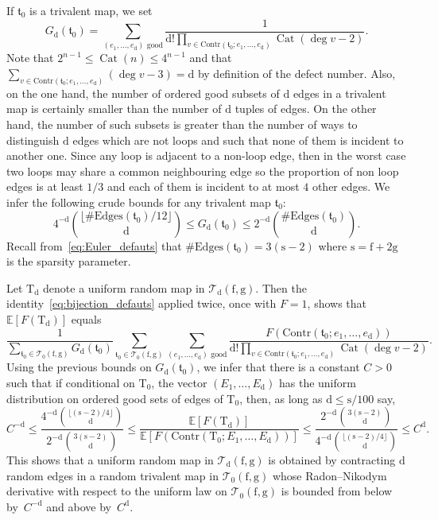 \documentclass[10pt]{amsart}
\DeclareMathOperator{\Cat}{Cat}
\theoremstyle{plain}
\theoremstyle{definition}
\theoremstyle{remark}
\newcommand{\E}{\mathbb{E}}
\newcommand{\Triv}{\mathrm{T}}
\newcommand{\face}{\mathrm{f}}
\newcommand{\defect}{\mathrm{d}}
\newcommand{\gen}{\mathrm{g}}
\newcommand{\spar}{\mathrm{s}}
\begin{document}
If $\mathfrak{t}_0$ is a trivalent map, we set
\[
G_\defect(\mathfrak{t}_0) = \sum_{(e_1, \dots, e_{\defect}) \text{ good}} \frac{1}{\defect! \prod_{v \in \mathrm{Contr}(\mathfrak{t}_0 ; e_1, \dots, e_{\defect})} \Cat(\deg v - 2)}.
\]
Note that $2^{n-1} \le \Cat(n) \le 4^{n-1}$ and that $\sum_{v \in \mathrm{Contr}(\mathfrak{t}_0 ; e_1, \dots, e_{\defect})} (\deg v - 3) = \defect$ by definition of the defect number. Also, on the one hand, the number of ordered good subsets of $\defect$ edges in a trivalent map is certainly smaller than the number of $\defect$ tuples of edges.
On the other hand, the number of such subsets is greater than the number of ways to distinguish $\defect$ edges which are not loops and such that none of them is incident to another one. Since any loop is adjacent to a non-loop edge, then in the worst case two loops may share a common neighbouring edge so the proportion of non loop edges is at least $1/3$ and each of them is incident to at most $4$ other edges.
We infer the following crude bounds for any trivalent map $\mathfrak{t}_0$:
\[
4^{-\defect} \binom{\lfloor \#\mathrm{Edges}(\mathfrak{t}_0)/12\rfloor}{\defect} \le G_\defect(\mathfrak{t}_0) \le 2^{-\defect} \binom{\#\mathrm{Edges}(\mathfrak{t}_0)}{\defect}.
\]
Recall from~\eqref{eq:Euler_defauts} that $\#\mathrm{Edges}(\mathfrak{t}_0) = 3(\spar-2)$ where $\spar = \face+2\gen$ is the sparsity parameter.

Let $\Triv_\defect$ denote a uniform random map in $\mathcal{T}_{\defect}(\face,\gen)$. Then the identity~\eqref{eq:bijection_defauts} applied twice, once with $F=1$, shows that $\E[F(\Triv_{ \defect})]$ equals
\[
\frac{1}{\sum_{\mathfrak{t}_0 \in \mathcal{T}_0(\face, \gen)} G_\defect(\mathfrak{t}_0)} \sum_{\mathfrak{t}_0 \in \mathcal{T}_0(\face, \gen)} \sum_{(e_1, \dots, e_\defect) \text{ good}} \frac{F(\mathrm{Contr}(\mathfrak{t}_0 ; e_1, \dots, e_\defect))}{\defect! \prod_{v \in \mathrm{Contr}(\mathfrak{t}_0 ; e_1, \dots, e_\defect)} \Cat(\deg v - 2)}.
\]
Using the previous bounds on $G_\defect(\mathfrak{t}_0)$, we infer that there is a constant $C>0$ such that if conditional on $\Triv_0$, the vector $(E_1, \dots, E_\defect)$ has the uniform distribution on ordered good sets of edges of $\Triv_0$, then, as long as $ \defect \le \spar/100$ say,
\begin{equation} \label{eq:RNexp}
C^{-\defect}
\le \frac{4^{-\defect} \binom{\lfloor (\spar-2)/4\rfloor}{\defect}}{2^{-\defect} \binom{3 (\spar-2)}{\defect}}
\le \frac{\E[F(\Triv_{ \defect})]}{\E[F(\mathrm{Contr}(\Triv_0 ; E_1, \dots, E_\defect))]}
\le \frac{2^{-\defect} \binom{3 (\spar-2)}{\defect}}{4^{-\defect} \binom{\lfloor (\spar-2)/4\rfloor}{\defect}}
\le C^\defect.
\end{equation}
This shows that a uniform random map in $\mathcal{T}_{\defect}(\face,\gen)$ is obtained by contracting $ \defect$ random edges in a random trivalent map in $\mathcal{T}_{0}(\face, \gen)$ whose Radon--Nikodym derivative with respect to the uniform law on $\mathcal{T}_{0}(\face, \gen)$ is bounded from below by~$C^{- \defect}$ and above by~$C^{ \defect}$.
\end{document}
